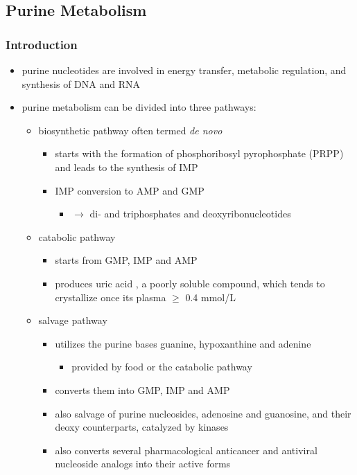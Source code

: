 \documentclass[12pt]{scrartcl}
\begin{document}
\subsection{Purine Metabolism}
\label{sec:org9c3e1c3}
\subsubsection{Introduction}
\label{sec:org180e744}
\begin{itemize}
\item purine nucleotides are involved in energy transfer, metabolic
regulation, and synthesis of DNA and RNA
\item purine metabolism can be divided into three pathways:
\begin{itemize}
\item biosynthetic pathway often termed \emph{de novo}
\begin{itemize}
\item starts with the formation of phosphoribosyl pyrophosphate (PRPP)
and leads to the synthesis of IMP
\item IMP conversion to AMP and GMP
\begin{itemize}
\item \(\to\) di- and triphosphates and deoxyribonucleotides
\end{itemize}
\end{itemize}
\item catabolic pathway
\begin{itemize}
\item starts from GMP, IMP and AMP
\item produces uric acid , a poorly soluble compound, which tends to
crystallize once its plasma \(\ge\) 0.4 mmol/L
\end{itemize}
\item salvage pathway
\begin{itemize}
\item utilizes the purine bases guanine, hypoxanthine and adenine
\begin{itemize}
\item provided by food or the catabolic pathway
\end{itemize}
\item converts them into GMP, IMP and AMP
\item also salvage of purine nucleosides, adenosine and guanosine, and
their deoxy counterparts, catalyzed by kinases
\item also converts several pharmacological anticancer and antiviral
nucleoside analogs into their active forms
\end{itemize}
\end{itemize}


\end{itemize}
\end{document}
